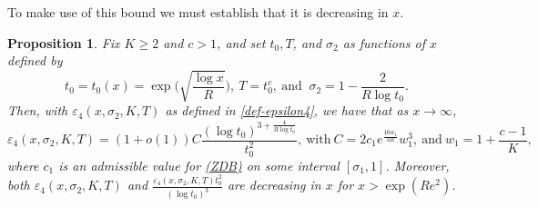 \documentclass[10pt]{amsart}
\newcommand{\s}{\sigma}
\newtheorem{prop}{Proposition}[section]
\theoremstyle{definition}
\numberwithin{equation}{section}
\begin{document}
To make use of this bound we must establish that it is decreasing in $x$.
\begin{prop}\label{epsilon4-dec}\label{epsilon4-dec-simple}
Fix $K\ge 2$ and $c>1$, and set $t_0, T$, and $\sigma_2$ as functions of $x$ defined by 
\begin{equation}\label{def-t0-T-sigma2}
t_0 = t_0(x) = \exp\Big(\sqrt{\frac{\log x} R}\Big),\ 
T=t_0^c,\ \text{and }\ 
\sigma_2 = 1-\frac{2}{R\log t_0} .
\end{equation}
Then, with $\varepsilon_4(x,\s_2,K,T)$ as defined in \eqref{def-epsilon4}, we have that as $x\to \infty$,
\begin{equation}\label{asymp-eps4}
\varepsilon_4(x,\s_2,K,T) 
=(1+o(1)) C \frac{(\log t_0)^{3+\frac{4}{R\log t_0}}}{t_0^2}, \ \text{with}\ 
  C = 2 c_1   e^{\frac{16w_{1}}{3 R} } w_{1}^{3},
  \ \text{and}\ w_1 =1 + \frac{c-1}{K},
\end{equation}
where $c_1$ is an admissible value for \hyperref[ZDB]{(ZDB)} on some interval $[\sigma_1,1]$.
Moreover, both $\varepsilon_4(x,\s_2,K,T)$ and  
$   \frac{\varepsilon_4(x,\s_2,K,T)t_0^2}{(\log t_0)^3} $
are decreasing in $x$ for $x>\exp(R e^2)$. 
\end{prop}
%
\end{document}
